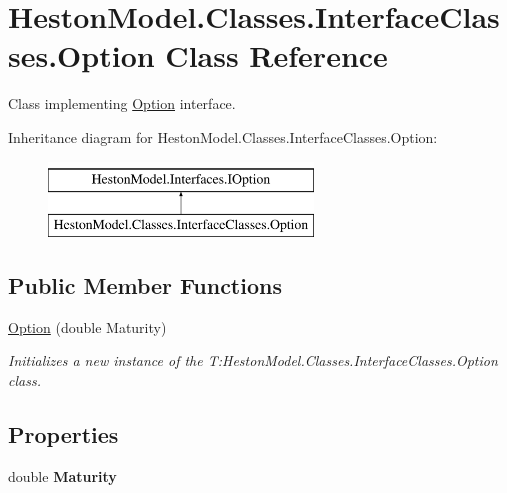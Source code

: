 \hypertarget{class_heston_model_1_1_classes_1_1_interface_classes_1_1_option}{}\section{Heston\+Model.\+Classes.\+Interface\+Classes.\+Option Class Reference}
\label{class_heston_model_1_1_classes_1_1_interface_classes_1_1_option}


Class implementing \mbox{\hyperlink{class_heston_model_1_1_classes_1_1_interface_classes_1_1_option}{Option}} interface.  


Inheritance diagram for Heston\+Model.\+Classes.\+Interface\+Classes.\+Option\+:\begin{figure}[H]
\begin{center}
\leavevmode
\includegraphics[height=2.000000cm]{class_heston_model_1_1_classes_1_1_interface_classes_1_1_option}
\end{center}
\end{figure}
\subsection*{Public Member Functions}
\begin{DoxyCompactItemize}
\item 
\mbox{\hyperlink{class_heston_model_1_1_classes_1_1_interface_classes_1_1_option_ad67f6a726c6cba37c85104bc9240844a}{Option}} (double Maturity)
\begin{DoxyCompactList}\small\item\em Initializes a new instance of the T\+:\+Heston\+Model.\+Classes.\+Interface\+Classes.\+Option class. \end{DoxyCompactList}\end{DoxyCompactItemize}
\subsection*{Properties}
\begin{DoxyCompactItemize}
\item 
\mbox{\label{class_heston_model_1_1_classes_1_1_interface_classes_1_1_option_a6addca62f75b4eee1e15f394e165aae1}} 
double {\bfseries Maturity}
\end{DoxyCompactItemize}


